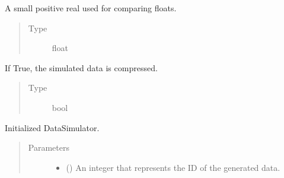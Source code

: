 \documentclass[a4paper,10pt,english]{sphinxhowto}
\begin{document}
\begin{fulllineitems}
\begin{fulllineitems}
\begin{quote}
\begin{description}
\end{description}\end{quote}

\end{fulllineitems}


\begin{fulllineitems}
\label{\detokenize{utils:utils.data_simulator.DataSimulator.epsilon}}
A small positive real used for comparing floats.
\begin{quote}\begin{description}
\item[{Type}] \leavevmode
float

\end{description}\end{quote}

\end{fulllineitems}


\begin{fulllineitems}
\label{\detokenize{utils:utils.data_simulator.DataSimulator.compress}}
If True, the simulated data is compressed.
\begin{quote}\begin{description}
\item[{Type}] \leavevmode
bool

\end{description}\end{quote}

\end{fulllineitems}


\begin{fulllineitems}
\label{\detokenize{utils:utils.data_simulator.DataSimulator.__init__}}
Initialized DataSimulator.
\begin{quote}\begin{description}
\item[{Parameters}] \leavevmode\begin{itemize}
\item {} 
 () \textendash{} An integer that represents the ID of the generated data.


\end{itemize}
\end{description}
\end{quote}
\end{fulllineitems}
\end{fulllineitems}
\end{document}

